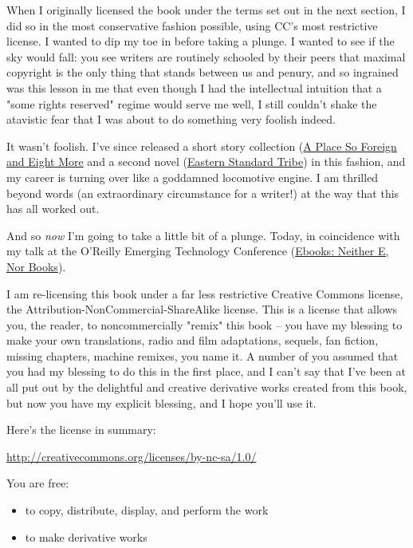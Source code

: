 When I originally licensed the book under the terms set out in the
next section, I did so in the most conservative fashion possible,
using CC's most restrictive license. I wanted to dip my toe in
before taking a plunge. I wanted to see if the sky would fall: you
see writers are routinely schooled by their peers that maximal
copyright is the only thing that stands between us and penury, and
so ingrained was this lesson in me that even though I had the
intellectual intuition that a "some rights reserved" regime would
serve me well, I still couldn't shake the atavistic fear that I was
about to do something very foolish indeed.

It wasn't foolish. I've since released a short story collection
(\href{http://craphound.com/place}{A Place So Foreign and Eight More}
and a second novel
(\href{http://craphound.com/est}{Eastern Standard Tribe}) in this
fashion, and my career is turning over like a goddamned locomotive
engine. I am thrilled beyond words (an extraordinary circumstance
for a writer!) at the way that this has all worked out.

And so \emph{now} I'm going to take a little bit of a plunge.
Today, in coincidence with my talk at the O'Reilly Emerging
Technology Conference
(\href{http://conferences.oreillynet.com/cs/et2004/view/e\_sess/4693}{Ebooks: Neither E, Nor Books}).

I am re-licensing this book under a far less restrictive Creative
Commons license, the Attribution-NonCommercial-ShareAlike license.
This is a license that allows you, the reader, to noncommercially
"remix" this book -- you have my blessing to make your own
translations, radio and film adaptations, sequels, fan fiction,
missing chapters, machine remixes, you name it. A number of you
assumed that you had my blessing to do this in the first place, and
I can't say that I've been at all put out by the delightful and
creative derivative works created from this book, but now you have
my explicit blessing, and I hope you'll use it.

Here's the license in summary:

\href{http://creativecommons.org/licenses/by-nc-sa/1.0/}{http://creativecommons.org/licenses/by-nc-sa/1.0/}

You are free:

\begin{itemize}
\item
to copy, distribute, display, and perform the work
\item to make derivative works
\end{itemize}

